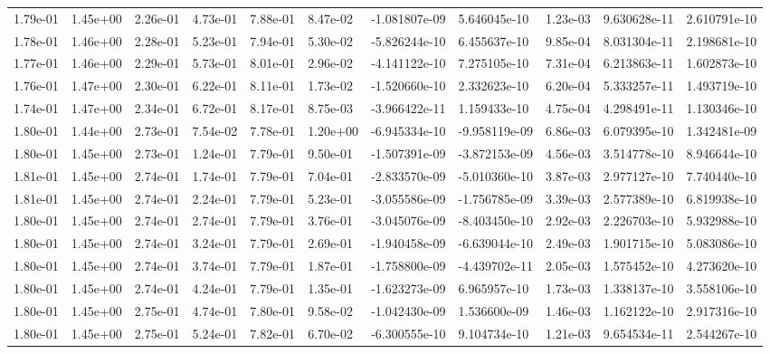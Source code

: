 \begin{longtable}{| p{} | p{} |}
1.79e-01 & 1.45e+00 & 2.26e-01 & 4.73e-01 & 7.88e-01 & 8.47e-02 & -1.081807e-09 &  5.646045e-10 &  1.23e-03 &  9.630628e-11 &  2.610791e-10 \\
1.78e-01 & 1.46e+00 & 2.28e-01 & 5.23e-01 & 7.94e-01 & 5.30e-02 & -5.826244e-10 &  6.455637e-10 &  9.85e-04 &  8.031304e-11 &  2.198681e-10 \\
1.77e-01 & 1.46e+00 & 2.29e-01 & 5.73e-01 & 8.01e-01 & 2.96e-02 & -4.141122e-10 &  7.275105e-10 &  7.31e-04 &  6.213863e-11 &  1.602873e-10 \\
1.76e-01 & 1.47e+00 & 2.30e-01 & 6.22e-01 & 8.11e-01 & 1.73e-02 & -1.520660e-10 &  2.332623e-10 &  6.20e-04 &  5.333257e-11 &  1.493719e-10 \\
1.74e-01 & 1.47e+00 & 2.34e-01 & 6.72e-01 & 8.17e-01 & 8.75e-03 & -3.966422e-11 &  1.159433e-10 &  4.75e-04 &  4.298491e-11 &  1.130346e-10 \\
1.80e-01 & 1.44e+00 & 2.73e-01 & 7.54e-02 & 7.78e-01 & 1.20e+00 & -6.945334e-10 & -9.958119e-09 &  6.86e-03 &  6.079395e-10 &  1.342481e-09 \\
1.80e-01 & 1.45e+00 & 2.73e-01 & 1.24e-01 & 7.79e-01 & 9.50e-01 & -1.507391e-09 & -3.872153e-09 &  4.56e-03 &  3.514778e-10 &  8.946644e-10 \\
1.81e-01 & 1.45e+00 & 2.74e-01 & 1.74e-01 & 7.79e-01 & 7.04e-01 & -2.833570e-09 & -5.010360e-10 &  3.87e-03 &  2.977127e-10 &  7.740440e-10 \\
1.81e-01 & 1.45e+00 & 2.74e-01 & 2.24e-01 & 7.79e-01 & 5.23e-01 & -3.055586e-09 & -1.756785e-09 &  3.39e-03 &  2.577389e-10 &  6.819938e-10 \\
1.80e-01 & 1.45e+00 & 2.74e-01 & 2.74e-01 & 7.79e-01 & 3.76e-01 & -3.045076e-09 & -8.403450e-10 &  2.92e-03 &  2.226703e-10 &  5.932988e-10 \\
1.80e-01 & 1.45e+00 & 2.74e-01 & 3.24e-01 & 7.79e-01 & 2.69e-01 & -1.940458e-09 & -6.639044e-10 &  2.49e-03 &  1.901715e-10 &  5.083086e-10 \\
1.80e-01 & 1.45e+00 & 2.74e-01 & 3.74e-01 & 7.79e-01 & 1.87e-01 & -1.758800e-09 & -4.439702e-11 &  2.05e-03 &  1.575452e-10 &  4.273620e-10 \\
1.80e-01 & 1.45e+00 & 2.74e-01 & 4.24e-01 & 7.79e-01 & 1.35e-01 & -1.623273e-09 &  6.965957e-10 &  1.73e-03 &  1.338137e-10 &  3.558106e-10 \\
1.80e-01 & 1.45e+00 & 2.75e-01 & 4.74e-01 & 7.80e-01 & 9.58e-02 & -1.042430e-09 &  1.536600e-09 &  1.46e-03 &  1.162122e-10 &  2.917316e-10 \\
1.80e-01 & 1.45e+00 & 2.75e-01 & 5.24e-01 & 7.82e-01 & 6.70e-02 & -6.300555e-10 &  9.104734e-10 &  1.21e-03 &  9.654534e-11 &  2.544267e-10 \\

\end{longtable}
